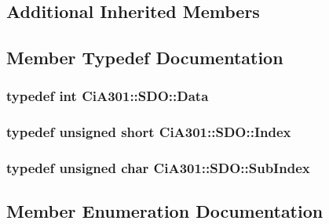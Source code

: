 \subsection*{Additional Inherited Members}


\subsection{Member Typedef Documentation}
\hypertarget{struct_ci_a301_1_1_s_d_o_a8224c82a3130510d9cdb8ae739de624b}{}
\subsubsection[{Data}]{\setlength{\rightskip}{0pt plus 5cm}typedef int {\bf Ci\+A301\+::\+S\+D\+O\+::\+Data}}\label{struct_ci_a301_1_1_s_d_o_a8224c82a3130510d9cdb8ae739de624b}
\hypertarget{struct_ci_a301_1_1_s_d_o_a23ec0bef652b1fad0123ec3bed770852}{}
\subsubsection[{Index}]{\setlength{\rightskip}{0pt plus 5cm}typedef unsigned short {\bf Ci\+A301\+::\+S\+D\+O\+::\+Index}}\label{struct_ci_a301_1_1_s_d_o_a23ec0bef652b1fad0123ec3bed770852}
\hypertarget{struct_ci_a301_1_1_s_d_o_add21496adb09c6f74c8f725c17ec116a}{}
\subsubsection[{Sub\+Index}]{\setlength{\rightskip}{0pt plus 5cm}typedef unsigned char {\bf Ci\+A301\+::\+S\+D\+O\+::\+Sub\+Index}}\label{struct_ci_a301_1_1_s_d_o_add21496adb09c6f74c8f725c17ec116a}


\subsection{Member Enumeration Documentation}
\hypertarget{struct_ci_a301_1_1_s_d_o_a775f3ad0c6ad9894efd23092a37906ea}{}
